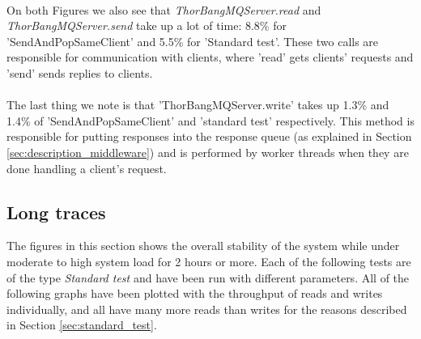 \documentclass{article}
\begin{document}
            ~\\
            On both Figures we also see that \textit{ThorBangMQServer.read} and \textit{ThorBangMQServer.send} take up a lot of time: 8.8\% for 'SendAndPopSameClient' and 5.5\% for 'Standard test'. These two calls are responsible for communication with clients, where 'read' gets clients' requests and 'send' sends replies to clients.\\
            \\
            The last thing we note is that 'ThorBangMQServer.write' takes up 1.3\% and 1.4\% of 'SendAndPopSameClient' and 'standard test' respectively. This method is responsible for putting responses into the response queue (as explained in Section \ref{sec:description_middleware}) and is performed by worker threads when they are done handling a client's request.


        \subsection{Long traces}
            The figures in this section shows the overall stability of the system while under moderate to high system load for 2 hours or more. Each of the following tests are of the type \textit{Standard test} and have been run with different parameters. All of the following graphs have been plotted with the throughput of reads and writes individually, and all have many more reads than writes for the reasons described in Section \ref{sec:standard_test}.
            
\end{document}
